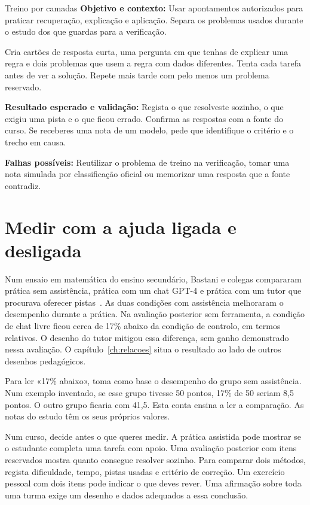 \begin{promptlabbox}{Treino por camadas}
\textbf{Objetivo e contexto:} Usar apontamentos autorizados para praticar recuperação, explicação e aplicação. Separa os problemas usados durante o estudo dos que guardas para a verificação.

Cria cartões de resposta curta, uma pergunta em que tenhas de explicar uma regra e dois problemas que usem a regra com dados diferentes. Tenta cada tarefa antes de ver a solução. Repete mais tarde com pelo menos um problema reservado.

\textbf{Resultado esperado e validação:} Regista o que resolveste sozinho, o que exigiu uma pista e o que ficou errado. Confirma as respostas com a fonte do curso. Se receberes uma nota de um modelo, pede que identifique o critério e o trecho em causa.

\textbf{Falhas possíveis:} Reutilizar o problema de treino na verificação, tomar uma nota simulada por classificação oficial ou memorizar uma resposta que a fonte contradiz.
\end{promptlabbox}

\section{Medir com a ajuda ligada e desligada}

Num ensaio em matemática do ensino secundário, Bastani e colegas compararam prática sem assistência, prática com um chat GPT-4 e prática com um tutor que procurava oferecer pistas~\citep{bastani2025}. As duas condições com assistência melhoraram o desempenho durante a prática. Na avaliação posterior sem ferramenta, a condição de chat livre ficou cerca de 17\% abaixo da condição de controlo, em termos relativos. O desenho do tutor mitigou essa diferença, sem ganho demonstrado nessa avaliação. O capítulo~\ref{ch:relacoes} situa o resultado ao lado de outros desenhos pedagógicos.

Para ler «17\% abaixo», toma como base o desempenho do grupo sem assistência. Num exemplo inventado, se esse grupo tivesse 50 pontos, 17\% de 50 seriam 8,5 pontos. O outro grupo ficaria com 41,5. Esta conta ensina a ler a comparação. As notas do estudo têm os seus próprios valores.

Num curso, decide antes o que queres medir. A prática assistida pode mostrar se o estudante completa uma tarefa com apoio. Uma avaliação posterior com itens reservados mostra quanto consegue resolver sozinho. Para comparar dois métodos, regista dificuldade, tempo, pistas usadas e critério de correção. Um exercício pessoal com dois itens pode indicar o que deves rever. Uma afirmação sobre toda uma turma exige um desenho e dados adequados a essa conclusão.
